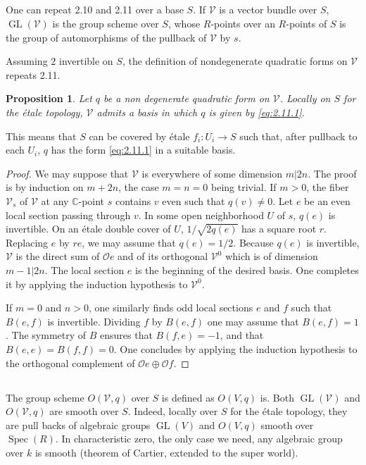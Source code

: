\documentclass[11pt,a4paper]{article}
\theoremstyle{plain}
\newtheorem{proposition}[theorem]{Proposition}
\theoremstyle{definition}
\DeclareMathOperator{\Spec}{Spec}
\DeclareMathOperator{\GL}{GL}
\newcommand{\C}{\mathbb{C}}
\begin{document}
\subsection{}
One can repeat 2.10 and 2.11 over a base $S$. If $\mathcal{V}$ is a vector bundle over $S$, $\GL(\mathcal{V})$ is the group scheme over $S$, whose $R$-points over an $R$-points of $S$ is the group of automorphisms of the pullback of $\mathcal{V}$ by $s$.

Assuming $2$ invertible on $S$, the definition of nondegenerate quadratic forms on $\mathcal{V}$ repeats 2.11.

\begin{proposition}\label{prop:2.13}
Let $q$ be a non degenerate quadratic form on $\mathcal{V}$. Locally on $S$ for the \'etale topology, $\mathcal{V}$ admits a basis in which $q$ is given by \eqref{eq:2.11.1}.
\end{proposition}

This means that $S$ can be covered by \'etale $f_i : U_i \to S$ such that, after pullback to each $U_i$, $q$ has the form \eqref{eq:2.11.1} in a suitable basis.

\begin{proof}
We may suppose that $\mathcal{V}$ is everywhere of some dimension $m|2n$. The proof is by induction on $m+2n$, the case $m = n = 0$ being trivial. If $m > 0$, the fiber $\mathcal{V}_s$ of $\mathcal{V}$ at any $\C$-point $s$ contains $v$ even such that $q(v) \neq 0$. Let $e$ be an even local section passing through $v$. In some open neighborhood $U$ of $s$, $q(e)$ is invertible. On an \'etale double cover of $U$, $1/\sqrt{2q(e)}$ has a square root $r$. Replacing $e$ by $re$, we may assume that $q(e) = 1/2$. Because $q(e)$ is invertible, $\mathcal{V}$ is the direct sum of $\mathcal{O}e$ and of its orthogonal $\mathcal{V}^0$ which is of dimension $m-1|2n$. The local section $e$ is the beginning of the desired basis. One completes it by applying the induction hypothesis to $\mathcal{V}^0$.

If $m = 0$ and $n > 0$, one similarly finds odd local sections $e$ and $f$ such that $B(e,f)$ is invertible. Dividing $f$ by $B(e,f)$ one may assume that $B(e,f) = 1$. The symmetry of $B$ ensures that $B(f,e) = -1$, and that $B(e,e) = B(f,f) = 0$. One concludes by applying the induction hypothesis to the orthogonal complement of $\mathcal{O}e \oplus \mathcal{O}f$.
\end{proof}

\subsection{}
\label{sec:2.14}
The group scheme $O(\mathcal{V}, q)$ over $S$ is defined as $O(V,q)$ is. Both $\GL(\mathcal{V})$ and $O(\mathcal{V}, q)$ are smooth over $S$. Indeed, locally over $S$ for the \'etale topology, they are pull backs of algebraic groups $\GL(V)$ and $O(V,q)$ smooth over $\Spec(R)$. In characteristic zero, the only case we need, any algebraic group over $k$ is smooth (theorem of Cartier, extended to the super world).
\end{document}
